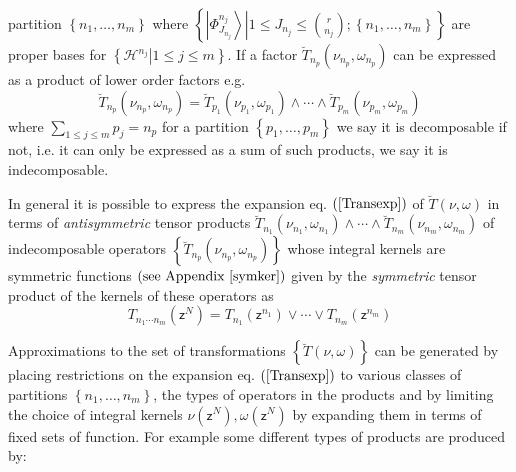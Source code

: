 \documentclass[aps,preprint]{revtex4}%
\begin{document}
partition $\left\{  n_{1},\ldots,n_{m}\right\}  $ where $\left\{  \left.
\left\vert \Phi_{J_{n_{j}}}^{n_{j}}\right\rangle \right\vert 1\leq J_{n_{j}%
}\leq\binom{r}{n_{j}};\left\{  n_{1},\ldots,n_{m}\right\}  \right\}  $ are
proper bases for $\left\{  \left.  \mathcal{H}^{n_{j}}\right\vert 1\leq j\leq
m\right\}  $. If a factor $\breve{T}_{n_{p}}\left(  \nu_{n_{p}},\omega_{n_{p}%
}\right)  $ can be expressed as a product of lower order factors e.g.
\begin{equation}
\breve{T}_{n_{p}}\left(  \nu_{n_{p}},\omega_{n_{p}}\right)  =\breve{T}_{p_{1}%
}\left(  \nu_{p_{1}},\omega_{p_{1}}\right)  \wedge\cdots\wedge\breve{T}%
_{p_{m}}\left(  \nu_{p_{m}},\omega_{p_{m}}\right)
\end{equation}
where $%
{\textstyle\sum\limits_{1\leq j\leq m}}
p_{j}=n_{p}$ for a partition $\left\{  p_{1},\ldots,p_{m}\right\}  $ we say it
is decomposable if not, i.e. it can only be expressed as a sum of such
products, we say it is indecomposable.

In general it is possible to express the expansion eq. $\left(  \ref{Transexp}%
\right)  $ of $\breve{T}\left(  \nu,\omega\right)  $ in terms of
\emph{antisymmetric} tensor products $\breve{T}_{n_{1}}\left(  \nu_{n_{1}%
},\omega_{n_{1}}\right)  \wedge\cdots\wedge\breve{T}_{n_{m}}\left(  \nu
_{n_{m}},\omega_{n_{m}}\right)  $ of indecomposable operators $\left\{
\breve{T}_{n_{p}}\left(  \nu_{n_{p}},\omega_{n_{p}}\right)  \right\}  $ whose
integral kernels are symmetric functions $\left(  \text{see Appendix
}\ref{symker}\right)  $ given by the \emph{symmetric }\cite{Marcus}%
\cite{Greub} tensor product of the kernels of these operators as\emph{ }
\begin{equation}
T_{n_{1}\cdots n_{m}}\left(  \mathsf{z}^{N}\right)  =T_{n_{1}}\left(
\mathsf{z}^{n_{1}}\right)  \vee\cdots\vee T_{n_{m}}\left(  \mathsf{z}^{n_{m}%
}\right)
\end{equation}


Approximations to the set of transformations $\left\{  \breve{T}\left(
\nu,\omega\right)  \right\}  $ can be generated by placing restrictions on the
expansion eq. $\left(  \ref{Transexp}\right)  $ to various classes of
partitions $\left\{  n_{1},\ldots,n_{m}\right\}  $, the types of operators in
the products and by limiting the choice of integral kernels $\nu\left(
\mathsf{z}^{N}\right)  ,\omega\left(  \mathsf{z}^{N}\right)  $ by expanding
them in terms of fixed sets of function. For example some different types of
products are produced by:
\end{document}

